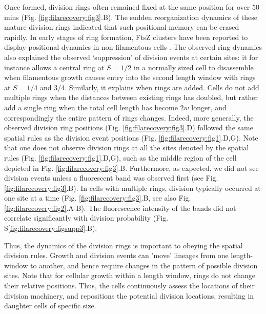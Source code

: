 Once formed, division rings often remained fixed at the same position for over 50 mins (Fig. \ref{fig:filarecovery:fig3}.B). The sudden reorganization dynamics of these mature division rings indicated that such positional memory can be erased rapidly. In early stages of ring formation, FtsZ clusters have been reported to display positional dynamics in non-filamentous cells \cite{Tsukanov2011}. The observed ring dynamics also explained the observed ‘suppression’ of division events at certain sites: it for instance allows a central ring at $S = 1/2$ in a normally sized cell to disassemble when filamentous growth causes entry into the second length window with rings at $S = 1/4$ and 3/4. Similarly, it explains when rings are added. Cells do not add multiple rings when the distances between existing rings has doubled, but rather add a single ring when the total cell length has become $2w$ longer, and correspondingly the entire pattern of rings changes. Indeed, more generally, the observed division ring positions (Fig. \ref{fig:filarecovery:fig3}.D) followed the same spatial rules as the division event positions (Fig. \ref{fig:filarecovery:fig1}.D,G). Note that one does not observe division rings at all the sites denoted by the spatial rules (Fig. \ref{fig:filarecovery:fig1}.D,G), such as the middle region of the cell depicted in Fig. \ref{fig:filarecovery:fig3}.B. Furthermore, as expected, we did not see division events unless a fluorescent band was observed first (see Fig. \ref{fig:filarecovery:fig3}.B). In cells with multiple rings, division typically occurred at one site at a time (Fig. \ref{fig:filarecovery:fig3}.B, see also Fig. \ref{fig:filarecovery:fig2}.A-B). The fluorescence intensity of the bands did not correlate significantly with division probability (Fig. S\ref{fig:filarecovery:figsupp3}.B). 

Thus, the dynamics of the division rings is important to obeying the spatial division rules. Growth and division events can 'move' lineages from one length-window to another, and hence require changes in the pattern of possible division sites. Note that for cellular growth within a length window, rings do not change their relative positions. Thus, the cells continuously assess the locations of their division machinery, and repositions the potential division locations, resulting in daughter cells of specific size. 

